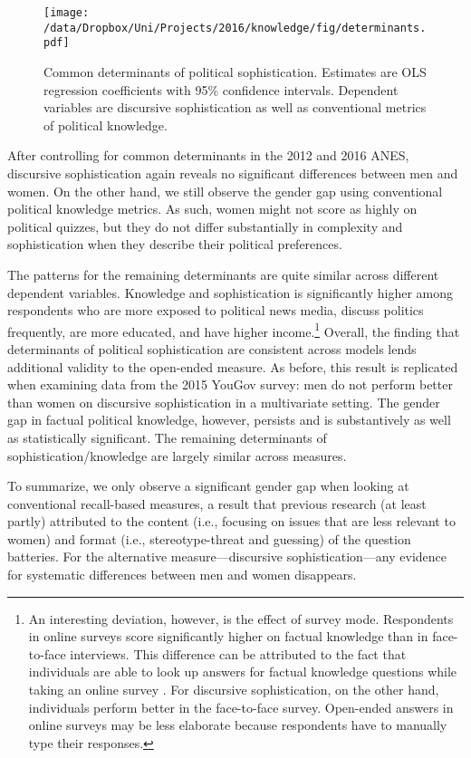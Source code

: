 \begin{figure}[h]\centering
\texttt{[image: /data/Dropbox/Uni/Projects/2016/knowledge/fig/determinants.pdf]}
\caption{Common determinants of political sophistication. Estimates are OLS regression coefficients with 95\% confidence intervals. Dependent variables are discursive sophistication as well as conventional metrics of political knowledge.
}\label{fig:determinants}
\end{figure}

After controlling for common determinants in the 2012 and 2016 ANES, discursive sophistication again reveals no significant differences between men and women. On the other hand, we still observe the gender gap using conventional political knowledge metrics. As such, women might not score as highly on political quizzes, but they do not differ substantially in complexity and sophistication when they describe their political preferences.

The patterns for the remaining determinants are quite similar across different dependent variables. Knowledge and sophistication is significantly higher among respondents who are more exposed to political news media, discuss politics frequently, are more educated, and have higher income.\footnote{An interesting deviation, however, is the effect of survey mode. Respondents in online surveys score significantly higher on factual knowledge than in face-to-face interviews. This difference can be attributed to the fact that individuals are able to look up answers for factual knowledge questions while taking an online survey \citep[c.f.,][]{clifford2016cheating}. For discursive sophistication, on the other hand, individuals perform better in the face-to-face survey. Open-ended answers in online surveys may be less elaborate because respondents have to manually type their responses.} Overall, the finding that determinants of political sophistication are consistent across models lends additional validity to the open-ended measure. As before, this result is replicated when examining data from the 2015 YouGov survey: men do not perform better than women on discursive sophistication in a multivariate setting. The gender gap in factual political knowledge, however, persists and is substantively as well as statistically significant. The remaining determinants of sophistication/knowledge are largely similar across measures.

To summarize, we only observe a significant gender gap when looking at conventional recall-based measures, a result that previous research (at least partly) attributed to the content (i.e., focusing on issues that are less relevant to women) and format (i.e., stereotype-threat and guessing) of the question batteries. For the alternative measure---discursive sophistication---any evidence for systematic differences between men and women disappears.


